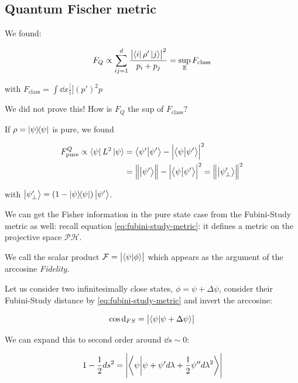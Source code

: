 \documentclass[main.tex]{subfiles}
\begin{document}
\subsection{Quantum Fischer metric}

We found:

\begin{equation}
F_Q \propto \sum_{ij=1}^d \frac{\abs{\bra{i}\rho'\ket{j}}^2}{p_i + p_j} = \sup_{\mathbb{E}} F_{\text{class}}
\end{equation}

with \(
F_{\text{class}} = \int \dd{x} \frac[i]{(p')^2}{p}
\)

\begin{greenbox}
  We did not prove this! How is \(F_Q\) the sup of \(F _{\text{class}} \)?
\end{greenbox}

If \(\rho = \dyad{\psi} \) is pure, we found

\begin{subequations}
\begin{align}
F^{Q}_{\text{pure}} \propto \bra{\psi} L^2 \ket{\psi} &= \braket{\psi'}{\psi'} - \abs{\braket{\psi}{\psi'}}^2 \\
&= \norm{\ket{\psi'}} -\abs{\braket{\psi}{\psi'}}^2
= \norm{\ket{\psi_\perp'}}^2
\end{align}
\end{subequations}

with \(\ket{\psi_\perp'}=(1-\ketbra{\psi})\ket{\psi'}\).

We can get the Fisher information in the pure state case from the Fubini-Study metric as well: recall equation \eqref{eq:fubini-study-metric}: it defines a metric on the projective space \(\mathcal{P} \mathcal{H}\).

We call the scalar product \(\mathcal{F}=\abs{\braket{\psi}{\phi}}\) which appears as the argument of the arccosine \emph{Fidelity}.

Let us consider two infinitesimally close states, \(\phi = \psi + \Delta\psi\), consider their Fubini-Study distance by \eqref{eq:fubini-study-metric} and invert the arccosine:

\begin{equation}
\cos \dd_{FS} = \abs{\braket{\psi}{\psi+\Delta\psi}}
\end{equation}

We can expand this to second order around \(\dd{s} \sim 0\):

\begin{equation}
1-\frac{1}{2} ds^2 = \abs{\braket{\psi}{\psi + \psi'd\lambda + \frac{1}{2}\psi'' d\lambda^2}}
\end{equation}
\end{document}
